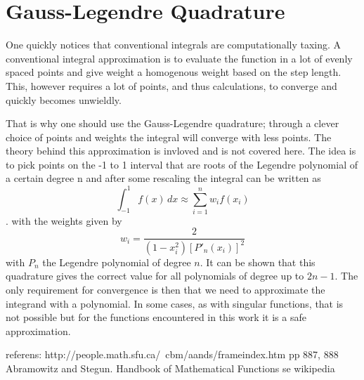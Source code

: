 \section{Gauss-Legendre Quadrature}
\label{app:gauss-legendre}

One quickly notices that conventional integrals are computationally taxing. 
A conventional integral approximation is to evaluate the function in a lot of evenly spaced points and give weight a homogenous weight based on the step length. 
This, however requires a lot of points, and thus calculations, to converge and quickly becomes unwieldly. 

That is why one should use the Gauss-Legendre quadrature; through a clever choice of points and weights the integral will converge with less points. 
The theory behind this approximation is invloved \cite{Gauss magazine nr 17 millenium edition 1800} and is not covered here. 
The idea is to pick points on the -1 to 1 interval that are roots of the Legendre polynomial of a certain degree n and after some rescaling the integral can be written as
\[
\int_{-1}^1 f(x)\,dx \approx \sum_{i=1}^n w_i f(x_i)
\].
with the weights given by
\[ 
w_i = \frac{2}{\left( 1-x_i^2 \right) [P'_n(x_i)]^2}
\] 
with $P_n$ the Legendre polynomial of degree $n$.
It can be shown that this quadrature gives the correct value for all polynomials of degree up to $2n-1$. 
The only requirement for convergence is then that we need to approximate the integrand with a polynomial.
In some cases, as with singular functions, that is not possible but for the functions encountered in this work it is a safe approximation.



referens: http://people.math.sfu.ca/~cbm/aands/frameindex.htm
pp 887, 888 Abramowitz and Stegun. Handbook of Mathematical Functions 
se wikipedia

